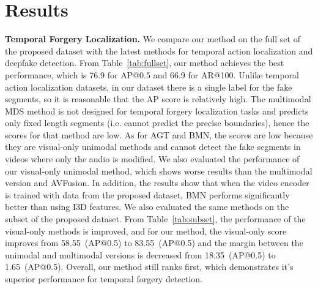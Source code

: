 \documentclass[conference, a4paper]{IEEEtran}
\makeatletter
\newcommand*{\ie}{i.e.\@\xspace}
\makeatother
\begin{document}
\begin{table*}
\centering
\caption{\textbf{Temporal forgery localization results on the full set (see Section~\ref{sec:experiments} for details) of the proposed dataset.} The contribution of different loss terms in the proposed method (see Section~\ref{sec:proposed_method} for details).}
\label{tab:losses}
\end{table*}
    
\section{Results}
\label{sec:results}
\noindent \textbf{Temporal Forgery Localization.} We compare our method on the full set of the proposed dataset with the latest methods for temporal action localization and deepfake detection. From Table~\ref{tab:fullset}, our method achieves the best performance, which is 76.9 for AP@0.5 and 66.9 for AR@100. Unlike temporal action localization datasets, in our dataset there is a single label for the fake segments, so it is reasonable that the AP score is relatively high. The multimodal MDS method is not designed for temporal forgery localization tasks and predicts only fixed length segments (\ie cannot predict the precise boundaries), hence the scores for that method are low. As for AGT and BMN, the scores are low because they are visual-only unimodal methods and cannot detect the fake segments in videos where only the audio is modified. We also evaluated the performance of our visual-only unimodal method, which shows worse results than the multimodal version and AVFusion. In addition, the results show that when the video encoder is trained with data from the proposed dataset, BMN performs significantly better than using I3D features. We also evaluated the same methods on the subset of the proposed dataset. From Table~\ref{tab:subset}, the performance of the visual-only methods is improved, and for our method, the visual-only score improves from 58.55~(AP@0.5) to 83.55~(AP@0.5) and the margin between the unimodal and multimodal versions is decreased from 18.35~(AP@0.5) to 1.65~(AP@0.5). Overall, our method still ranks first, which demonstrates it's superior performance for temporal forgery detection.
\end{document}
